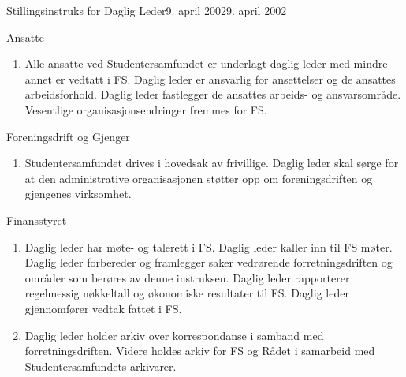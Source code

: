 \begin{instruks}{Stillingsinstruks for Daglig Leder}{9. april 2002}{9. april 2002}
    \begin{instruksledd}{Ansatte}
    \begin{enumerate}
	  \item Alle ansatte ved Studentersamfundet er underlagt daglig leder med mindre annet er vedtatt i FS. Daglig leder er ansvarlig for
ansettelser og de ansattes arbeidsforhold. Daglig leder fastlegger de ansattes arbeids- og ansvarsområde. Vesentlige
organisasjonsendringer fremmes for FS.
    \end{enumerate}
    \end{instruksledd}

    \begin{instruksledd}{Foreningsdrift og Gjenger}
    \begin{enumerate}
	  \item Studentersamfundet drives i hovedsak av frivillige. Daglig leder skal sørge for at den administrative organisasjonen
støtter opp om foreningsdriften og gjengenes virksomhet.
    \end{enumerate}
    \end{instruksledd}

    \begin{instruksledd}{Finansstyret}
    \begin{enumerate}
	  \item Daglig leder har møte- og talerett i FS. Daglig leder kaller inn til FS møter. Daglig leder forbereder og framlegger saker vedrørende
forretningsdriften og områder som berøres av denne instruksen. Daglig leder rapporterer regelmessig nøkkeltall og
økonomiske resultater til FS. Daglig leder gjennomfører vedtak fattet i FS.
    \item Daglig leder holder arkiv over korrespondanse i samband med forretningsdriften. Videre holdes arkiv for FS og Rådet
i samarbeid med Studentersamfundets arkivarer.
    \end{enumerate}
    \end{instruksledd}

\end{instruks}


